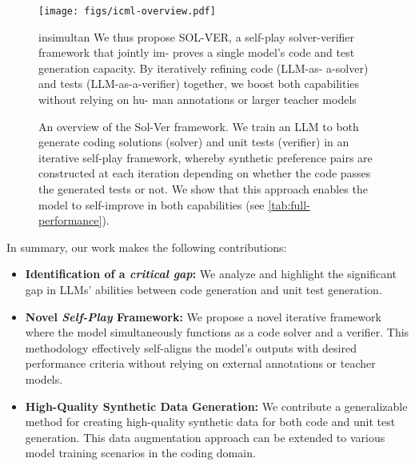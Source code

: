 \begin{figure*}[h]
    \centering
    \texttt{[image: figs/icml-overview.pdf]}
    \caption{An overview of the {\sc Sol-Ver} framework.
We train an LLM to both generate coding solutions (solver) and unit tests (verifier) in an iterative self-play framework, whereby synthetic preference pairs are constructed at each iteration depending on whether the code passes the generated tests or not.
We show that this approach enables the model to self-improve in both capabilities (see \autoref{tab:full-performance}).
    }
insimultan
    We thus propose SOL-VER, a
self-play solver-verifier framework that jointly im-
proves a single model’s code and test generation
capacity. By iteratively refining code (LLM-as-
a-solver) and tests (LLM-as-a-verifier) together,
we boost both capabilities without relying on hu-
man annotations or larger teacher models
\fi 
    \label{fig:enter-label}
\end{figure*}

In summary, our work makes the following contributions:
\begin{itemize}[leftmargin=*]
    \item \textbf{Identification of a {\em critical gap}:} We analyze and highlight the significant gap in LLMs' abilities between code generation and unit test generation.
    \item \textbf{Novel \textit{Self-Play} Framework:} We propose a novel iterative framework where the model simultaneously functions as a code solver and a verifier. This methodology effectively self-aligns the model's outputs with desired performance criteria without relying on external annotations or teacher models.
    \item \textbf{High-Quality Synthetic Data Generation:} We contribute a generalizable method for creating high-quality synthetic data for both code and unit test generation. This data augmentation approach can be extended to various model training scenarios in the coding domain.
\end{itemize}


